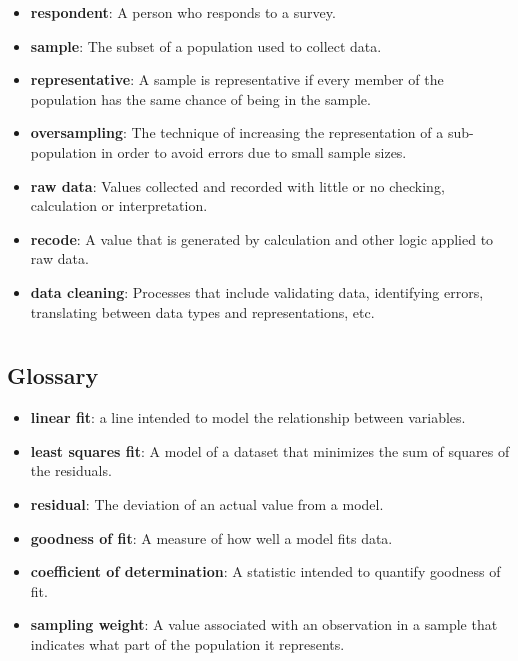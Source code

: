 \begin{itemize}
	\item {\bf respondent}: A person who responds to a survey.
	
	\item {\bf sample}: The subset of a population used to collect data.
	
	\item {\bf representative}: A sample is representative if every member
	of the population has the same chance of being in the sample.
	
	\item {\bf oversampling}: The technique of increasing the representation
	of a sub-population in order to avoid errors due to small sample
	sizes.
	
	\item {\bf raw data}: Values collected and recorded with little or no
	checking, calculation or interpretation.
	
	\item {\bf recode}: A value that is generated by calculation and other
	logic applied to raw data.
	
	\item {\bf data cleaning}: Processes that include validating data,
	identifying errors, translating between data types and
	representations, etc.
	
\end{itemize}



 \chapter{ }  \section*{Glossary} \begin{itemize}
	
	\item {\bf linear fit}: a line intended to model the relationship between
	variables.  
	
	\item {\bf least squares fit}: A model of a dataset that minimizes the
	sum of squares of the residuals.
	
	\item {\bf residual}: The deviation of an actual value from a model.
	
	\item {\bf goodness of fit}: A measure of how well a model fits data.
	
	\item {\bf coefficient of determination}: A statistic intended to
	quantify goodness of fit.
	
	\item {\bf sampling weight}: A value associated with an observation in a
	sample that indicates what part of the population it represents.
	
\end{itemize}

